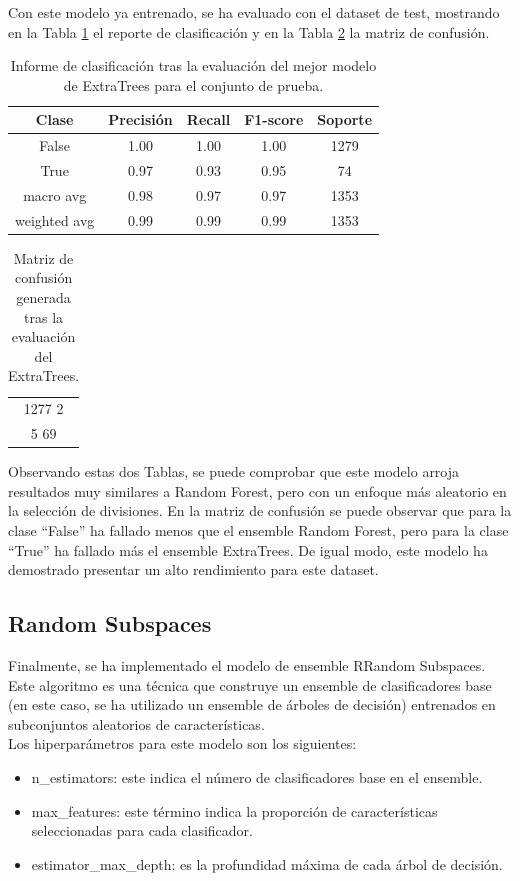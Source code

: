 \documentclass[12pt,letterpaper]{article}
\begin{document}
Con este modelo ya entrenado, se ha evaluado con el dataset de test, mostrando en la Tabla \ref{tab:res-ET} el reporte de clasificación y en la Tabla \ref{tab:confusion-ET} la matriz de confusión.
\begin{table}[H]
    \centering
    \begin{tabular}{|c|c|c|c|c|}
    \hline
    Clase & Precisión & Recall & F1-score & Soporte \\ \hline \hline
    False & 1.00 & 1.00 & 1.00 & 1279 \\ \hline
    True & 0.97 & 0.93 & 0.95 &  74 \\ \hline
     macro avg & 0.98 & 0.97 & 0.97 & 1353 \\ \hline
    weighted avg  & 0.99 & 0.99 & 0.99 & 1353 \\ \hline
    \end{tabular}
    \caption{Informe de clasificación tras la evaluación del mejor modelo de ExtraTrees para el conjunto de prueba.}
    \label{tab:res-ET}
\end{table}

\begin{table}[H]
    \centering
    \begin{tabular}{|c|}
    \hline
    1277 \hspace{8mm} 2 \\
    5 \hspace{12mm} 69 \\ \hline
    \end{tabular}
    \caption{Matriz de confusión generada tras la evaluación del ExtraTrees.}
    \label{tab:confusion-ET}
\end{table}

Observando estas dos Tablas, se puede comprobar que este modelo arroja resultados muy similares a Random Forest, pero con un enfoque más aleatorio en la selección de divisiones. En la matriz de confusión se puede observar que para la clase ``False'' ha fallado menos que el ensemble Random Forest, pero para la clase ``True'' ha fallado más el ensemble ExtraTrees. De igual modo, este modelo ha demostrado presentar un alto rendimiento para este dataset.

\subsection{Random Subspaces}
Finalmente, se ha implementado el modelo de ensemble RRandom Subspaces. Este algoritmo es una técnica que construye un ensemble de clasificadores base (en este caso, se ha utilizado un ensemble de árboles de decisión) entrenados en subconjuntos aleatorios de características.\\
Los hiperparámetros para este modelo son los siguientes:
\begin{itemize}
    \item n\_estimators: este indica el número de clasificadores base en el ensemble.
    \item max\_features: este término indica la proporción de características seleccionadas para cada clasificador.
    \item estimator\_max\_depth: es la profundidad máxima de cada árbol de decisión.
\end{itemize}
\end{document}
